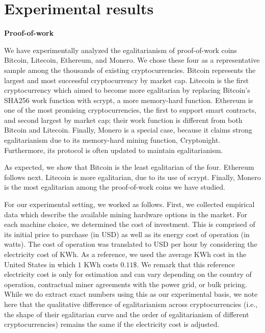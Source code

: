 \section{Experimental results}\label{sec:experiments}

\noindent\textbf{Proof-of-work}

\noindent
We have experimentally analyzed the egalitarianism of proof-of-work coins
Bitcoin, Litecoin, Ethereum, and Monero. We chose these four as a representative
sample among the thousands of existing cryptocurrencies. Bitcoin represents the
largest and most successful cryptocurrency by market cap. Litecoin is the first
cryptocurrency which aimed to become more egalitarian by replacing Bitcoin's
SHA256 work function with scrypt, a more memory-hard function. Ethereum is one
of the most promising cryptocurrencies, the first to support smart contracts,
and second largest by market cap; their work function is different from both
Bitcoin and Litecoin. Finally, Monero is a special case, because it claims
strong egalitarianism due to its memory-hard mining function, Cryptonight.
Furthermore, its protocol is often updated to maintain egalitarianism.

As expected, we show that Bitcoin is the least egalitarian of the four. Ethereum
follows next. Litecoin is more egalitarian, due to its use of scrypt. Finally,
Monero is the most egalitarian among the proof-of-work coins we have studied.


For our experimental setting, we worked as follows. First, we collected empirical
data which describe the available mining hardware options in the market. For
each machine choice, we determined the cost of investment. This is comprised
of its initial price to purchase (in USD) as well as its energy cost of
operation (in watts). The cost of operation was translated to USD per hour by
considering the electricity cost of KWh. As a reference, we used the average KWh cost in
the United States in which $1$ KWh costs $0.11\$$. We remark that this reference
electricity cost is only for estimation and can vary depending on the country of
operation, contractual miner agreements with the power grid, or bulk pricing.
While we do extract exact numbers using this as our experimental basis, we note
here that the qualitative difference of egalitarianism across cryptocurrencies
(i.e., the shape of their egalitarian curve and the order of egalitarianism of
different cryptocurrencies) remains the same if the electricity cost is
adjusted.

